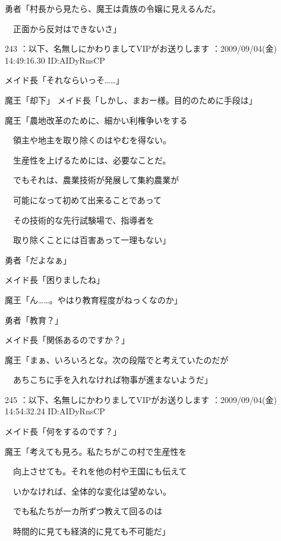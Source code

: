 \documentclass[a4j,twocolumn]{tarticle}
\begin{document}
勇者「村長から見たら、魔王は貴族の令嬢に見えるんだ。\par{} 
　正面から反対はできないさ」 

	
    
    

243 ：以下、名無しにかわりましてVIPがお送りします ：2009/09/04(金) 14:49:16.30 ID:AIDyRnsCP 


メイド長「それならいっそ……」 



魔王「却下」 
メイド長「しかし、まおー様。目的のために手段は」 



魔王「農地改革のために、細かい利権争いをする\par{} 
　領主や地主を取り除くのはやむを得ない。\par{} 
　生産性を上げるためには、必要なことだ。\par{} 
　でもそれは、農業技術が発展して集約農業が\par{} 
　可能になって初めて出来ることであって\par{} 
　その技術的な先行試験場で、指導者を\par{} 
　取り除くことには百害あって一理もない」 



勇者「だよなぁ」 



メイド長「困りましたね」 



魔王「ん……。やはり教育程度がねっくなのか」\par{} 
勇者「教育？」\par{} 
メイド長「関係あるのですか？」 



魔王「まぁ、いろいろとな。次の段階でと考えていたのだが\par{} 
　あちこちに手を入れなければ物事が進まないようだ」 

	
    
    

245 ：以下、名無しにかわりましてVIPがお送りします ：2009/09/04(金) 14:54:32.24 ID:AIDyRnsCP 


メイド長「何をするのです？」 



魔王「考えても見ろ。私たちがこの村で生産性を\par{} 
　向上させても。それを他の村や王国にも伝えて\par{} 
　いかなければ、全体的な変化は望めない。\par{} 
　でも私たちが一カ所ずつ教えて回るのは\par{} 
　時間的に見ても経済的に見ても不可能だ」 
\end{document}
